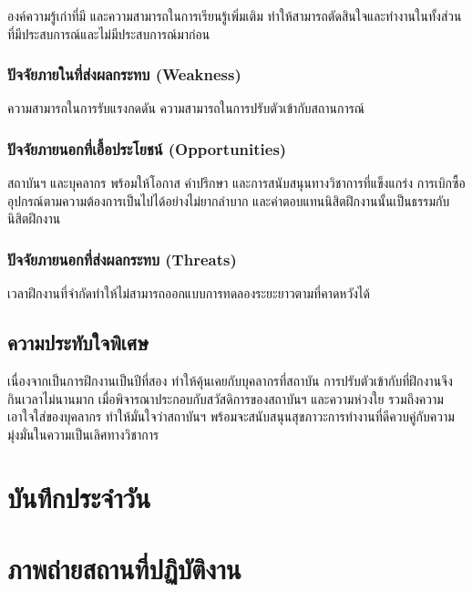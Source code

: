 \documentclass[16pt,a4]{internshipreport}
\begin{document}
องค์ความรู้เก่าที่มี และความสามารถในการเรียนรู้เพิ่มเติม ทำให้สามารถตัดสินใจและทำงานในทั้งส่วนที่มีประสบการณ์และไม่มีประสบการณ์มาก่อน

\subsection{ปัจจัยภายในที่ส่งผลกระทบ (Weakness)}

ความสามารถในการรับแรงกดดัน ความสามารถในการปรับตัวเข้ากับสถานการณ์

\subsection{ปัจจัยภายนอกที่เอื้อประโยชน์ (Opportunities)}

สถาบันฯ และบุคลากร พร้อมให้โอกาส คำปรึกษา และการสนับสนุนทางวิชาการที่แข็งแกร่ง การเบิกซื้ออุปกรณ์ตามความต้องการเป็นไปได้อย่างไม่ยากลำบาก และค่าตอบแทนนิสิตฝึกงานนั้นเป็นธรรมกับนิสิตฝึกงาน

\subsection{ปัจจัยภายนอกที่ส่งผลกระทบ (Threats)}

เวลาฝึกงานที่จำกัดทำให้ไม่สามารถออกแบบการทดลองระยะยาวตามที่คาดหวังได้
\section{ความประทับใจพิเศษ}

เนื่องจากเป็นการฝึกงานเป็นปีที่สอง ทำให้คุ้นเคยกับบุคลากรที่สถาบัน การปรับตัวเข้ากับที่ฝึกงานจึงกินเวลาไม่นานมาก เมื่อพิจารณาประกอบกับสวัสดิการของสถาบันฯ และความห่วงใย รวมถึงความเอาใจใส่ของบุคลากร ทำให้มั่นใจว่าสถาบันฯ พร้อมจะสนับสนุนสุขภาวะการทำงานที่ดีควบคู่กับความมุ่งมั่นในความเป็นเลิศทางวิชาการ




\begin{appendices}
\chapter{บันทึกประจำวัน}


\chapter{ภาพถ่ายสถานที่ปฏิบัติงาน}

\end{appendices}
\end{document}
